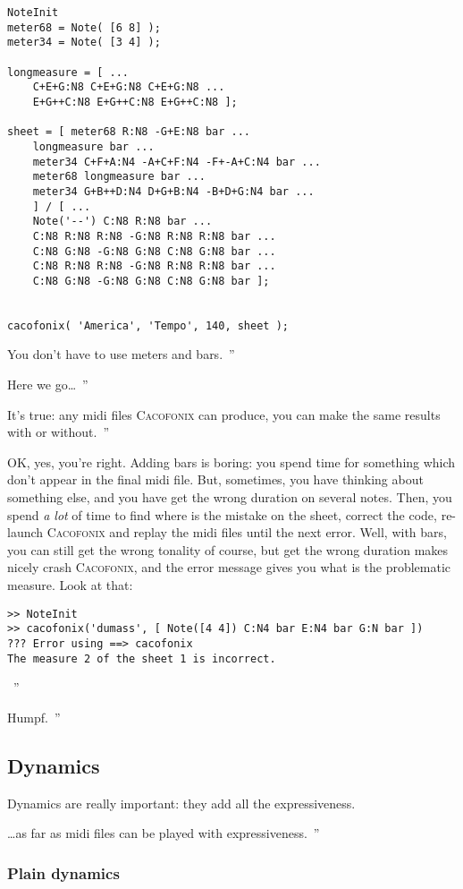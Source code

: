 \documentclass{article}
\newcommand{\cacofonix}{\textsc{Cacofonix}\xspace}
\newenvironment{meenv}{ \par \noindent \makebox[6em][r]{ \textcolor{mecolor}{Me}: `` --~}}{~''}
\newenvironment{myselfenv}{ \par \noindent \makebox[6em][r]{ \textcolor{myselfcolor}{Myself}: `` --~}}{~''}
\newcommand{\me}[1]{\begin{meenv}#1\end{meenv}}
\newcommand{\myself}[1]{\begin{myselfenv}#1\end{myselfenv}}
\begin{document}
\begin{lstlisting}
NoteInit
meter68 = Note( [6 8] );
meter34 = Note( [3 4] );

longmeasure = [ ...
	C+E+G:N8 C+E+G:N8 C+E+G:N8 ...
	E+G++C:N8 E+G++C:N8 E+G++C:N8 ];

sheet = [ meter68 R:N8 -G+E:N8 bar ...
	longmeasure bar ...
	meter34 C+F+A:N4 -A+C+F:N4 -F+-A+C:N4 bar ...
	meter68 longmeasure bar ...
	meter34 G+B++D:N4 D+G+B:N4 -B+D+G:N4 bar ...
	] / [ ...
	Note('--') C:N8 R:N8 bar ...
	C:N8 R:N8 R:N8 -G:N8 R:N8 R:N8 bar ...
	C:N8 G:N8 -G:N8 G:N8 C:N8 G:N8 bar ...
	C:N8 R:N8 R:N8 -G:N8 R:N8 R:N8 bar ...
	C:N8 G:N8 -G:N8 G:N8 C:N8 G:N8 bar ];
	

cacofonix( 'America', 'Tempo', 140, sheet );
\end{lstlisting}

\me{You don't have to use meters and bars.}
\myself{Here we go\dots}
\me{It's true: any midi files \cacofonix can produce, you can make the same results with or without.}
\begin{myselfenv}%
	OK, yes, you're right. Adding bars is boring: you spend time for something which don't appear in the final midi file. But, sometimes, you have thinking about something else, and you have get the wrong duration on several notes. Then, you spend \emph{a lot} of time to find where is the mistake on the sheet, correct the code, re-launch \cacofonix and replay the midi files until the next error. Well, with bars, you can still get the wrong tonality of course, but get the wrong duration makes nicely crash \cacofonix, and the error message gives you what is the problematic measure. Look at that:
\begin{lstlisting}
>> NoteInit
>> cacofonix('dumass', [ Note([4 4]) C:N4 bar E:N4 bar G:N bar ])
??? Error using ==> cacofonix
The measure 2 of the sheet 1 is incorrect.
\end{lstlisting}%
\end{myselfenv}
\me{Humpf.}

\subsection{Dynamics}
\label{sec:Dynamics}

Dynamics are really important: they add all the expressiveness.
\me{\dots as far as midi files can be played with expressiveness.}

\subsubsection{Plain dynamics}
\label{sec:PlainDynamics}
\end{document}
